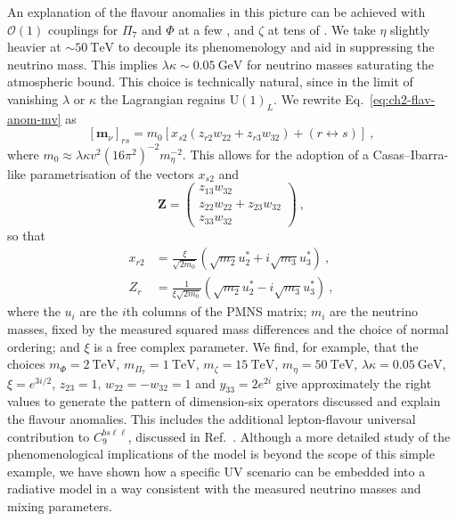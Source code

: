   An explanation of the flavour anomalies in this picture can be achieved with
  $\mathcal{O}(1)$ couplings for $\Pi_{7}$ and $\Phi$ at a few \TeV, and $\zeta$
  at tens of \TeV. We take $\eta$ slightly heavier at $\sim \SI{50}{\TeV}$ to
  decouple its phenomenology and aid in suppressing the neutrino mass. This
  implies $\lambda \kappa \sim \SI{0.05}{\GeV}$ for neutrino masses saturating
  the atmospheric bound. This choice is technically natural, since in the limit
  of vanishing $\lambda$ or $\kappa$ the Lagrangian regains $\mathrm{U}(1)_{L}$.
  We rewrite Eq.~\eqref{eq:ch2-flav-anom-mv} as
  \begin{equation}
    \label{eq:ch2-mv-ci-structure}
    [\mathbf{m}_{\nu}]_{rs} = m_{0} [ x_{s2}(z_{r2}w_{22} + z_{r3}w_{32}) + (r \leftrightarrow s) ] \ ,
  \end{equation}
  where $m_{0} \approx \lambda \kappa v^{2} (16\pi^{2})^{-2} m_{\eta}^{-2}$.
  This allows for the adoption of a Casas--Ibarra-like parametrisation of the
  vectors $x_{s2}$ and
  \begin{equation}
    \mathbf{Z} = \begin{pmatrix} z_{13}w_{32} \\ z_{22}w_{22} + z_{23}w_{32} \\ z_{33} w_{32} \end{pmatrix} \ ,
  \end{equation}
  so that~\cite{Cai:2014kra}
  \begin{equation}
    \label{eq:ch2-ci-anomalies}
    \begin{split}
    x_{r2} &= \frac{\xi}{\sqrt{2m_{0}}} \left(\sqrt{m_{2}} u_{2}^{*} + i \sqrt{m_{3}} u_{3}^{*} \right) \ , \\
    Z_{r} &= \frac{1}{\xi \sqrt{2m_{0}}} \left(\sqrt{m_{2}} u_{2}^{*} - i \sqrt{m_{3}} u_{3}^{*} \right) \ ,
    \end{split}
  \end{equation}
  where the $u_{i}$ are the $i$th columns of the PMNS matrix; $m_{i}$ are the
  neutrino masses, fixed by the measured squared mass differences and the choice
  of normal ordering; and $\xi$ is a free complex parameter. We find, for
  example, that the choices $m_{\Phi} = \SI{2}{\TeV}$,
  $m_{\Pi_{7}} = \SI{1}{\TeV}$, $m_{\zeta} = \SI{15}{\TeV}$,
  $m_{\eta} = \SI{50}{\TeV}$, $\lambda \kappa = \SI{0.05}{\GeV}$,
  $\xi = e^{3i/2}$, $z_{23} = 1$, $w_{22} = - w_{32} = 1$ and $y_{33} = 2e^{2i}$
  give approximately the right values to generate the pattern of dimension-six
  operators discussed and explain the flavour anomalies. This includes the
  additional lepton-flavour universal contribution to $C_{9}^{bs\ell\ell}$,
  discussed in Ref.~\cite{Aebischer:2019mlg}. Although a more detailed study of
  the phenomenological implications of the model is beyond the scope of this
  simple example, we have shown how a specific UV scenario can be embedded into
  a radiative model in a way consistent with the measured neutrino masses and
  mixing parameters.

